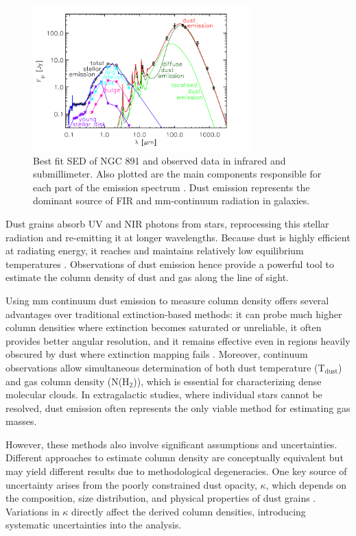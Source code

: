 \begin{figure}
    \centering
    \includegraphics[width=0.75\textwidth]{figures/dust_emission_blackbody.png}
    \caption{Best fit SED of NGC 891 and observed data in infrared and submillimeter. Also plotted are the main components responsible for each part of the emission spectrum \cite{popescu2011modelling}. Dust emission represents the dominant source of FIR and mm-continuum radiation in galaxies.}
    \label{fig:dust_emission_blackbody}
\end{figure}

Dust grains absorb UV and NIR photons from stars, reprocessing this stellar radiation and re-emitting it at longer wavelengths. 
Because dust is highly efficient at radiating energy, it reaches and maintains relatively low equilibrium temperatures \cite{hildebrand1983determination}. 
Observations of dust emission hence provide a powerful tool to estimate the column density of dust and gas along the line of sight.

Using mm continuum dust emission to measure column density offers several advantages over traditional extinction-based methods: it can probe much higher column densities where extinction becomes saturated or unreliable, it often provides better angular resolution, and it remains effective even in regions heavily obscured by dust where extinction mapping fails \cite{draine2003interstellar}. Moreover, continuum observations allow simultaneous determination of both dust temperature (T$_{\mathrm{dust}}$) and gas column density (N(H$_2$)), which is essential for characterizing dense molecular clouds. In extragalactic studies, where individual stars cannot be resolved, dust emission often represents the only viable method for estimating gas masses.

However, these methods also involve significant assumptions and uncertainties. Different approaches to estimate column density are conceptually equivalent but may yield different results due to methodological degeneracies. One key source of uncertainty arises from the poorly constrained dust opacity, $\kappa$, which depends on the composition, size distribution, and physical properties of dust grains \cite{ossenkopf1994dust}. Variations in $\kappa$ directly affect the derived column densities, introducing systematic uncertainties into the analysis.


